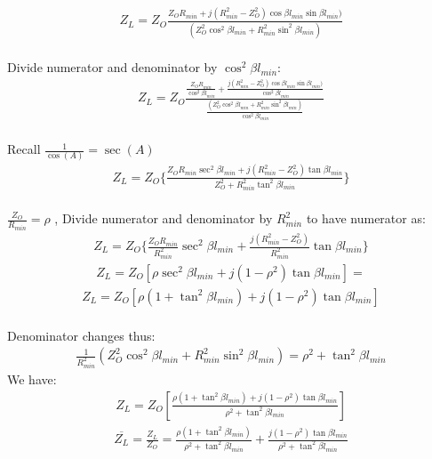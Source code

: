 \begin{align}
Z_{L} = Z_{O}\frac{Z_{O}R_{min} + j(R_{min}^{2}-Z_{O}^{2})\cos\beta l_{min}\sin\beta l_{min})}{(Z_{O}^{2}\cos^{2}\beta l_{min} + R_{min}^{2}\sin^{2}\beta l_{min})}
\end{align}\\

Divide numerator and denominator by $\cos^{2}\beta l_{min}$:\\

\begin{align*}
Z_{L} = Z_{O}\frac{\frac{Z_{O}R_{min}}{\cos^{2}\beta l_{min}} + \frac{j(R_{min}^{2}-Z_{O}^{2})\cos\beta l_{min}\sin\beta l_{min})}{\cos^{2}\beta l_{min}}}{\frac{(Z_{O}^{2}\cos^{2}\beta l_{min} + R_{min}^{2}\sin^{2}\beta l_{min})}{\cos^{2}\beta l_{min}}}
\end{align*}\\
Recall $ \frac{1}{\cos(A)} = \sec(A) $
\begin{align}
Z_{L} = Z_{O}\{\frac{Z_{O}R_{min}\sec^{2}\beta l_{min} + j(R_{min}^{2}-Z_{O}^{2})\tan\beta l_{min}}{Z_{O}^{2}+ R_{min}^{2}\tan^{2}\beta l_{min}}\}
\end{align}\\
$\frac{Z_{O}}{R_{min}} = \rho$ , Divide numerator and denominator by $R_{min}^{2}$ to have numerator as:\\
\begin{align*}
Z_{L} = Z_{O}\{\frac{Z_{O}R_{min}}{R_{min}^{2}}\sec^{2}\beta l_{min} + \frac{j(R_{min}^{2}-Z_{O}^{2})}{{R_{min}^{2}}}\tan\beta l_{min}\}
\end{align*}
\begin{align*}
Z_{L} = Z_{O} [\rho \sec^{2}\beta l_{min} + j(1-\rho^{2})\tan\beta l_{min}] =
\end{align*}
\begin{align*}
Z_{L} = Z_{O} [ \rho (1 + \tan^{2}\beta l_{min}) + j(1-\rho^{2})\tan\beta l_{min}]
\end{align*}\\ Denominator changes thus:
\begin{align*}
\frac{1}{R_{min}^{2}}{(Z_{O}^{2}\cos^{2}\beta l_{min} + R_{min}^{2}\sin^{2}\beta l_{min})} = \rho^{2} + \tan^{2}\beta l_{min}
\end{align*}
We have:
\begin{align}
Z_{L} = Z_{O} [\frac{\rho (1 + \tan^{2}\beta l_{min}) + j(1-\rho^{2})\tan\beta l_{min}}{\rho^{2} + \tan^{2}\beta l_{min}} ]
\end{align}
\begin{align*}
\overline{Z_{L}} = \frac{Z_{L}}{Z_{O}} =  \frac{\rho (1 + \tan^{2}\beta l_{min})}{\rho^{2} + \tan^{2}\beta l_{min}} + \frac{j(1-\rho^{2})\tan\beta l_{min}}{\rho^{2} + \tan^{2}\beta l_{min}}
\end{align*}

